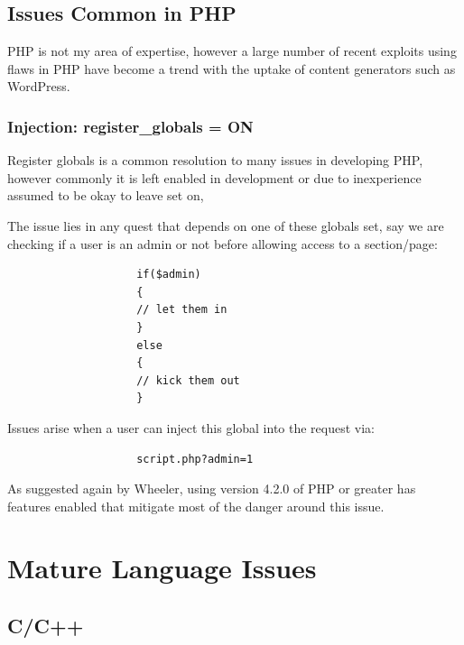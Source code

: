 \documentclass{IEEEtran}
\begin{document}
        \subsection{Issues Common in PHP}
            PHP is not my area of expertise, however a large number of recent exploits using 
            flaws in PHP have become a trend with the uptake of content generators such as WordPress.
            \subsubsection{Injection: register\_globals = ON}
                Register globals is a common resolution to many issues in developing PHP, however
                commonly it is left enabled in development or due to inexperience assumed to be okay to 
                leave set on,
                
                \newpage

                The issue lies in any quest that depends on one of these globals set, say we are 
                checking if a user is an admin or not before allowing access to a section/page:

                \lstset{style=php}
                \begin{lstlisting}
                    if($admin) 
                    { 
                    // let them in 
                    } 
                    else 
                    { 
                    // kick them out 
                    }
                \end{lstlisting}\cite{Devshed-PHP}

                Issues arise when a user can inject this global into the request via:

                \begin{lstlisting}
                    script.php?admin=1
                \end{lstlisting}

                As suggested again by Wheeler\cite{Wheeler}, using version 4.2.0 of PHP or greater has 
                features enabled that mitigate most of the danger around this issue.

    \section{Mature Language Issues}
        \subsection{C/C++}
\end{document}
